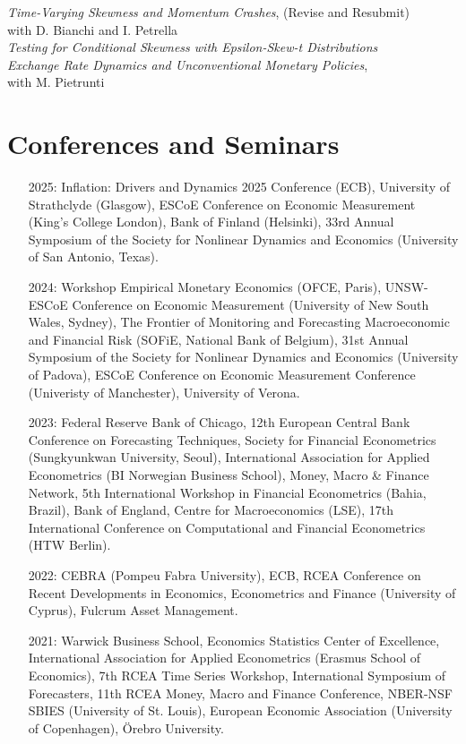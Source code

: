 \documentclass[a4paper,11pt]{article}
\begin{document}
\noindent \textit{Time-Varying Skewness and Momentum Crashes}, (Revise and Resubmit)\\
with D. Bianchi and I. Petrella \\

\noindent \textit{Testing for Conditional Skewness with Epsilon-Skew-t Distributions} \\

\noindent \textit{Exchange Rate Dynamics and Unconventional Monetary Policies},\\
with M. Pietrunti

\section{Conferences and Seminars} \begin{itemize}
    \item[2025:] Inflation: Drivers and Dynamics 2025 Conference (ECB), University of Strathclyde (Glasgow), ESCoE Conference on Economic Measurement (King's College London), Bank of Finland (Helsinki), 33rd Annual Symposium of the Society for Nonlinear Dynamics and Economics (University of San Antonio, Texas). 
    \item[2024:] Workshop Empirical Monetary Economics (OFCE, Paris), UNSW-ESCoE Conference on Economic Measurement (University of New South Wales, Sydney), The Frontier of Monitoring and Forecasting Macroeconomic and Financial Risk (SOFiE, National Bank of Belgium), 31st Annual Symposium of the Society for Nonlinear Dynamics and Economics (University of Padova), ESCoE Conference on Economic Measurement Conference (Univeristy of Manchester), University of Verona.
    \item[2023:] Federal Reserve Bank of Chicago, 12th European Central Bank Conference on Forecasting Techniques, Society for Financial Econometrics (Sungkyunkwan University, Seoul), International Association for Applied Econometrics (BI Norwegian Business School), Money, Macro \& Finance Network, 5th International Workshop in Financial Econometrics (Bahia, Brazil), Bank of England, Centre for Macroeconomics (LSE), 17th International Conference on Computational and Financial Econometrics (HTW Berlin). 
    \item[2022:] CEBRA (Pompeu Fabra University), ECB, RCEA Conference on Recent Developments in Economics, Econometrics and Finance (University of Cyprus), Fulcrum Asset Management.
    \item[2021:] Warwick Business School, Economics Statistics Center of Excellence, International Association for Applied Econometrics (Erasmus School of Economics), 7th RCEA Time Series Workshop, International Symposium of Forecasters, 11th RCEA Money, Macro and Finance Conference, NBER-NSF SBIES (University of St. Louis), European Economic Association (University of Copenhagen), \"Orebro University.

\end{itemize}
\end{document}
